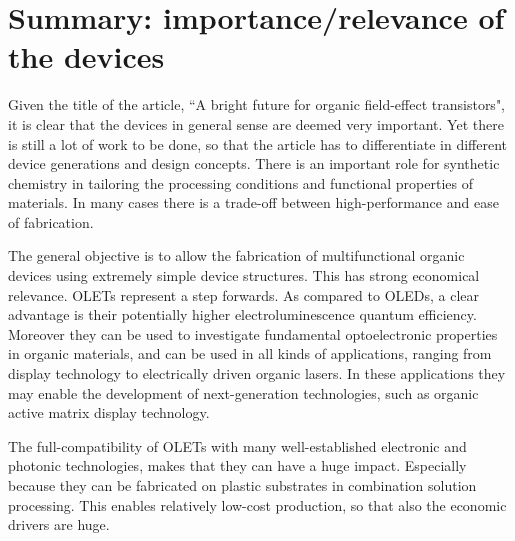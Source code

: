 \section{Summary: importance/relevance of the devices}

Given the title of the article, ``A bright future for organic field-effect transistors", it is clear that the devices in general sense are deemed very important. Yet there is still a lot of work to be done, so that the article has to differentiate in different device generations and design concepts. There is an important role for synthetic chemistry in tailoring the processing conditions and functional properties of materials. In many cases there is a trade-off between high-performance and ease of fabrication.

The general objective is to allow the fabrication of multifunctional organic devices using extremely simple device structures. This has strong economical relevance. OLETs represent a step forwards. As compared to OLEDs, a clear advantage is their potentially higher electroluminescence quantum efficiency. Moreover they can be used to investigate fundamental optoelectronic properties in organic materials, and can be used in all kinds of applications, ranging from display technology to electrically driven organic lasers. In these applications they may enable the development of next-generation technologies, such as organic active matrix display technology.

The full-compatibility of OLETs with many well-established electronic and photonic technologies, makes that they can have a huge impact. Especially because they can be fabricated on plastic substrates in combination solution processing. This enables relatively low-cost production, so that also the economic drivers are huge.